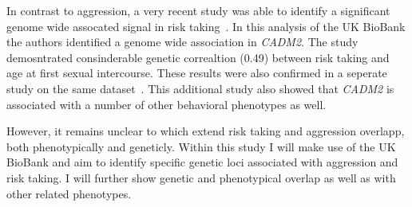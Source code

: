 In contrast to aggression, a very recent study was able to identify a significant genome wide assocated signal in risk taking~\cite{Day2016}. 
In this analysis of the UK BioBank the authors identified a genome wide association in \textit{CADM2}.
The study demosntrated consinderable genetic correaltion (0.49) between risk taking and age at first sexual intercourse.
These results were also confirmed in a seperate study on the same dataset~\cite{Boutwell2017}.
This additional study also showed that \textit{CADM2} is associated with a number of other behavioral phenotypes as well.

However, it remains unclear to which extend risk taking and aggression overlapp, both phenotypically and geneticly.
Within this study I will make use of the UK BioBank and aim to identify specific genetic loci associated with aggression and risk taking.
I will further show genetic and phenotypical overlap as well as with other related phenotypes.
